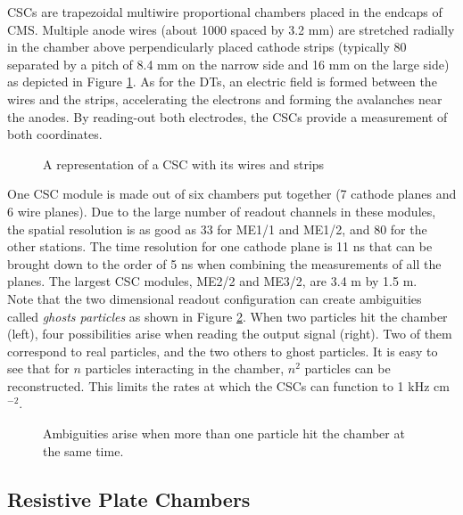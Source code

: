     			CSCs are trapezoidal multiwire proportional chambers placed in the endcaps of CMS. Multiple anode wires (about 1000 spaced by 3.2 mm) are stretched radially in the chamber above perpendicularly placed cathode strips (typically 80 separated by a pitch of 8.4 mm on the narrow side and 16 mm on the large side) as depicted in Figure \ref{fig:muon_chambers__csc}. As for the DTs, an electric field is formed between the wires and the strips, accelerating the electrons and forming the avalanches near the anodes. By reading-out both electrodes, the CSCs provide a measurement of both coordinates.

    			\begin{figure}[h!]
    				\centering
    				\caption{A representation of a CSC with its wires and strips \Cite{CMS_Performances}}
    				\label{fig:muon_chambers__csc}
    			\end{figure}

    			One CSC module is made out of six chambers put together (7 cathode planes and 6 wire planes). Due to the large number of readout channels in these modules, the spatial resolution is as good as 33 \um{} for ME1/1 and ME1/2, and 80 \um{} for the other stations. The time resolution for one cathode plane is 11 ns that can be brought down to the order of 5 ns when combining the measurements of all the planes. The largest CSC modules, ME2/2 and ME3/2, are 3.4 m by 1.5 m. \\

    			Note that the two dimensional readout configuration can create ambiguities called \emph{ghosts particles} as shown in Figure \ref{fig:muon_chambers__ghosts}. When two particles hit the chamber (left), four possibilities arise when reading the output signal (right). Two of them correspond to real particles, and the two others to ghost particles. It is easy to see that for $ n $ particles interacting in the chamber, $ n^2 $ particles can be reconstructed. This limits the rates at which the CSCs can function to 1 kHz cm$ ^{-2} $.

    			\begin{figure}[h!]
    				\centering
    				\caption{Ambiguities arise when more than one particle hit the chamber at the same time.}
    				\label{fig:muon_chambers__ghosts}
    			\end{figure}

    		\subsection{Resistive Plate Chambers}
    		\label{sec:muon_chambers__resistive_plate_chambers}

